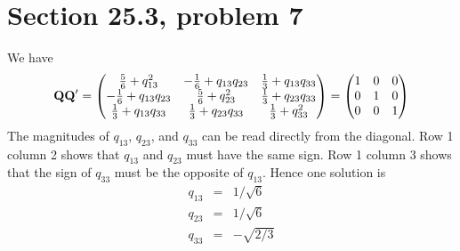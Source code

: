 \section{Section 25.3, problem 7}
We have
$${\bf QQ}'=\left(\begin{matrix}
{5\over6}+q_{13}^2 & -{1\over6}+q_{13}q_{23} & {1\over3}+q_{13}q_{33}\cr
-{1\over6}+q_{13}q_{23} & {5\over6}+q_{23}^2 & {1\over3}+q_{23}q_{33}\cr
{1\over3}+q_{13}q_{33} & {1\over3}+q_{23}q_{33} & {1\over3}+q_{33}^2
\end{matrix}\right)=\left(\begin{matrix}
1 & 0 & 0\cr
0 & 1 & 0\cr
0 & 0 & 1
\end{matrix}\right)
$$
The magnitudes of $q_{13}$, $q_{23}$, and $q_{33}$ can be read directly from the diagonal.
Row 1 column 2 shows that $q_{13}$ and $q_{23}$ must have the same sign.
Row 1 column 3 shows that the sign of $q_{33}$ must be the opposite of $q_{13}$. Hence one solution is
\begin{eqnarray*}
q_{13}&=&1/\sqrt6\\
q_{23}&=&1/\sqrt6\\
q_{33}&=&-\sqrt{2/3}
\end{eqnarray*}
